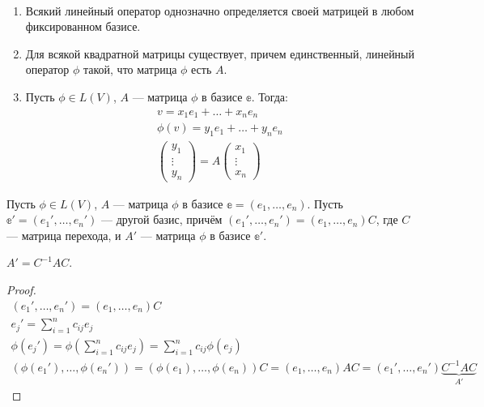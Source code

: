 \begin{Consequence}\
    \begin{enumerate}
        \item Всякий линейный оператор однозначно определяется своей матрицей в любом фиксированном базисе.
        \item Для всякой квадратной матрицы существует, причем единственный, линейный оператор $\phi$ такой, что матрица $\phi$ есть $A$.
        \item Пусть $\phi \in L(V)$, $A$ --- матрица $\phi$ в базисе $\mathbb{e}$. Тогда:
        \begin{gather*}
            v = x_1e_1 + \ldots + x_ne_n\\ \phi(v) = y_1e_1 + \ldots + y_n e_n \\
            \begin{pmatrix}
                y_1\\
                \vdots \\
                y_n
            \end{pmatrix} = A \begin{pmatrix}
                x_1\\
                \vdots \\
                x_n
            \end{pmatrix}
        \end{gather*}
    \end{enumerate}
\end{Consequence}
Пусть $\phi \in L(V)$, $A$ --- матрица $\phi$ в базисе $\mathbb{e} = (e_1, \ldots, e_n)$. Пусть $\mathbb{e}' = (e_1', \ldots, e_n')$ --- другой базис, причём $(e_1', \ldots, e_n') = (e_1, \ldots, e_n)C$, где $C$ --- матрица перехода, и $A'$ --- матрица $\phi$ в базисе $\mathbb{e}'$.
\begin{Suggestion}
    $A' = C^{-1}AC$.
\end{Suggestion}
\begin{proof}
    \begin{gather}
        (e_1', \ldots, e_n') = (e_1, \ldots, e_n)C  \\
        e_j' = \sum\limits_{i=1}^{n} c_{ij}e_j \\
        \phi(e_j') = \phi\left(\sum\limits_{i=1}^{n} c_{ij}e_j\right) = \sum\limits_{i=1}^nc_{ij}\phi(e_j)\\
        (\phi(e_1'), \ldots, \phi(e_n')) = (\phi(e_1),\ldots,\phi(e_n))C = (e_1, \ldots, e_n)AC= (e_1', \ldots, e_n')\underbrace{C^{-1}AC}_{A'}
    \end{gather}
\end{proof}

